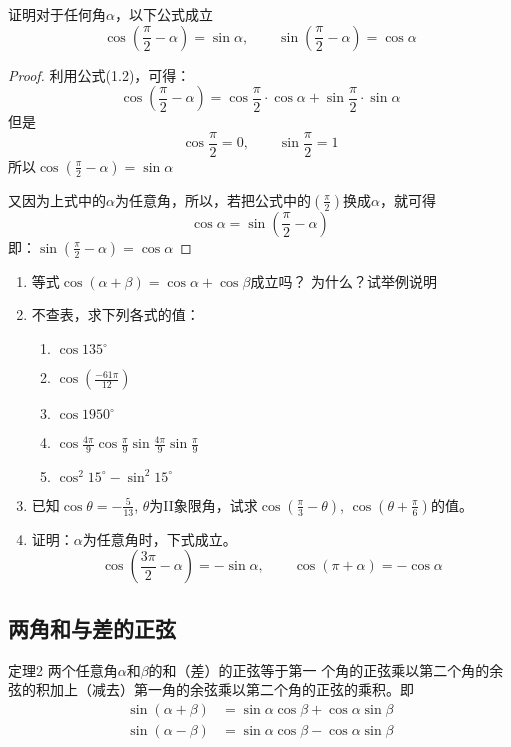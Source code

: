 \begin{example}
证明对于任何角$\alpha$，以下公式成立
\[\cos\left(\frac{\pi}{2}-\alpha\right)=\sin \alpha,\qquad \sin\left(\frac{\pi}{2}-\alpha\right)=\cos \alpha\]
\end{example}

\begin{proof}
利用公式(1.2)，可得：
\[\cos\left(\frac{\pi}{2}-\alpha\right)=\cos\frac{\pi}{2}\cdot \cos\alpha+\sin\frac{\pi}{2}\cdot \sin \alpha\]
但是
\[\cos\frac{\pi}{2}=0,\qquad \sin\frac{\pi}{2}=1\]
所以$\cos\left(\frac{\pi}{2}-\alpha\right)=\sin\alpha$

又因为上式中的$\alpha$为任意角，所以，若把公式中的$\left(\frac{\pi}{2}\right)$换成$\alpha$，就可得
\[\cos\alpha=\sin\left(\frac{\pi}{2}-\alpha\right)\]
即：$\sin\left(\frac{\pi}{2}-\alpha\right)=\cos\alpha$
\end{proof}

\begin{ex}
\begin{enumerate}
    \item 等式$\cos(\alpha+\beta)=\cos\alpha+\cos\beta$成立吗？
    为什么？试举例说明
    
    \item 不查表，求下列各式的值：
    \begin{multicols}{2}
    \begin{enumerate}
        \item $\cos135^{\circ}$
        \item $\cos\left(\frac{-61\pi}{12}\right)$
        \item $\cos1950^{\circ}$
        \item $\cos\frac{4\pi}{9} \cos\frac{\pi}{9}\sin\frac{4\pi}{9}\sin \frac{\pi}{9}$
        \item $\cos^2 15^{\circ}-\sin^2 15^{\circ}$
    \end{enumerate}        
    \end{multicols}

\item 已知$\cos\theta=-\frac{5}{13}$, $\theta$为II象限角，试求$\cos\left(\frac{\pi}{3}-\theta\right)$,
    $\cos\left(\theta+\frac{\pi}{6}\right)$的值。
    \item 证明：$\alpha$为任意角时，下式成立。
\[\cos\left(\frac{3\pi}{2}-\alpha\right)=-\sin\alpha,\qquad \cos(\pi+\alpha)=-\cos\alpha  \]
\end{enumerate}
\end{ex}


\subsection{两角和与差的正弦}
\begin{blk}{定理2}
两个任意角$\alpha$和$\beta$的和（差）的正弦等于第一
个角的正弦乘以第二个角的余弦的积加上（减去）第一角的余弦乘以第二个角的正弦的乘积。即
\begin{align}
    \sin (\alpha+\beta) &=\sin\alpha\cos\beta+\cos\alpha\sin\beta \\
    \sin (\alpha-\beta) &=\sin\alpha\cos\beta-\cos\alpha\sin\beta
\end{align}
\end{blk}

